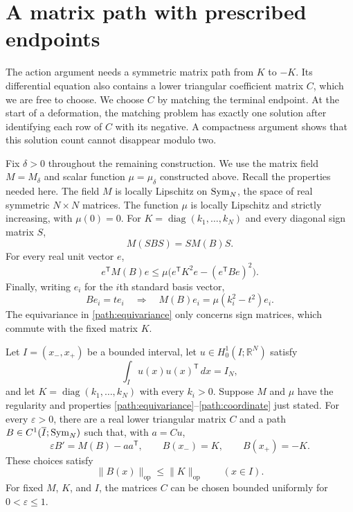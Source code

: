 \section{A matrix path with prescribed endpoints}\label{sec:path}

The action argument needs a symmetric matrix path from $K$ to $-K$.
Its differential equation also contains a lower triangular coefficient
matrix $C$, which we are free to choose.  We choose $C$ by matching the
terminal endpoint.  At the start of a deformation, the matching problem
has exactly one solution after identifying each row of $C$ with its
negative.  A compactness argument shows that this solution count cannot
disappear modulo two.

Fix $\delta>0$ throughout the remaining construction.  We use the
matrix field $M=M_\delta$ and scalar function $\mu=\mu_\delta$
constructed above.  Recall the properties needed here.  The field
$M$ is locally Lipschitz on $\operatorname{Sym}_N$, the space
of real symmetric $N\times N$ matrices.  The function $\mu$ is locally
Lipschitz and strictly increasing, with $\mu(0)=0$.  For
$K=\operatorname{diag}(k_1,\ldots,k_N)$ and every diagonal sign matrix
$S$,
\begin{equation}\label{path:equivariance}
 M(SBS)=SM(B)S.
\end{equation}
For every real unit vector $e$,
\begin{equation}\label{path:comparison}
 e^{\mathsf T}M(B)e
 \leq \mu\bigl(e^{\mathsf T}K^2e-(e^{\mathsf T}Be)^2\bigr).
\end{equation}
Finally, writing $e_i$ for the $i$th standard basis vector,
\begin{equation}\label{path:coordinate}
 Be_i=t e_i
 \quad\Longrightarrow\quad
 M(B)e_i=\mu(k_i^2-t^2)e_i.
\end{equation}
The equivariance in \eqref{path:equivariance} only concerns sign
matrices, which commute with the fixed matrix $K$.

\begin{proposition}\label{path:existence}
Let $I=(x_-,x_+)$ be a bounded interval, let
$u\in H^1_0(I;\mathbb R^N)$ satisfy
\[
 \int_I u(x)u(x)^{\mathsf T}\,dx=I_N,
\]
and let $K=\operatorname{diag}(k_1,\ldots,k_N)$ with every $k_i>0$.
Suppose $M$ and $\mu$ have the regularity and properties
\eqref{path:equivariance}--\eqref{path:coordinate} just stated.
For every $\varepsilon>0$, there are a real lower triangular matrix
$C$ and a path $B\in C^1(\overline I;\operatorname{Sym}_N)$ such that,
with $a=Cu$,
\begin{equation}\label{path:equation}
 \varepsilon B'=M(B)-aa^{\mathsf T},
 \qquad B(x_-)=K,\qquad B(x_+)=-K.
\end{equation}
These choices satisfy
\begin{equation}\label{path:operator-bound}
 \|B(x)\|_{\mathrm{op}}\leq\|K\|_{\mathrm{op}}
 \qquad(x\in I).
\end{equation}
For fixed $M$, $K$, and $I$, the matrices $C$ can be chosen bounded
uniformly for $0<\varepsilon\leq1$.
\end{proposition}

